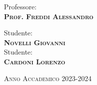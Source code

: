 \documentclass [a4paper,12pt]{report}
\begin{document}
\vspace{2cm}
\begin{flushleft}
Professore:\\\textsc{\textbf{Prof. Freddi Alessandro}}\\
\end{flushleft}
\vspace*{-1.55cm}
\begin{flushright}
Studente:\\\textsc{\textbf{Novelli Giovanni}}\\     
Studente:\\\textsc{\textbf{Cardoni Lorenzo}}\\ 
\end{flushright}
\vspace*{3.8cm}
\begin{center}
\large{\textsc{Anno Accademico 2023-2024}}
\end{center} \clearpage


\tableofcontents


\setcounter{secnumdepth}{3}
\clearemptydoublepage
 \clearemptydoublepage
 \clearemptydoublepage
 \clearemptydoublepage
 \clearemptydoublepage
 \clearemptydoublepage
 \clearemptydoublepage
 \clearemptydoublepage


\nocite{*}


\clearemptydoublepage

\nocite{*}



\listoffigures
\end{document}
